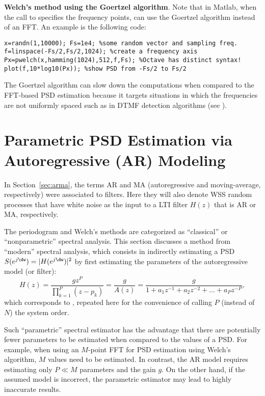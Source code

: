 \bExample \textbf{Welch's method using the Goertzel algorithm}.
Note that in Matlab, when the call to  specifies the frequency points,  can use the Goertzel algorithm instead of an FFT. An example is the following code:
\begin{lstlisting}
x=randn(1,10000); Fs=1e4; %some random vector and sampling freq.
f=linspace(-Fs/2,Fs/2,1024); %create a frequency axis
Px=pwelch(x,hamming(1024),512,f,Fs); %Octave has distinct syntax!
plot(f,10*log10(Px)); %show PSD from -Fs/2 to Fs/2
\end{lstlisting}
The Goertzel algorithm can slow down the computations when compared to the FFT-based PSD estimation because it targets situations in which the frequencies are not uniformly spaced such as in DTMF detection algorithms (see ).
\eExample 

\section{Parametric PSD Estimation via Autoregressive (AR) Modeling}
\label{sec:arModelingPSD}

In Section~\ref{sec:arma}, the terms AR and MA (autoregressive and moving-average, respectively) 
were associated to filters. Here they will also denote WSS random processes that have white noise as the
input to a LTI filter $H(z)$ that is AR or MA, respectively.

The periodogram and Welch's methods are categorized as ``classical'' or ``nonparametric'' spectral analysis.
This section discusses a method from ``modern'' spectral analysis, which consists in indirectly estimating a PSD $S(e^{j \dw})=|H(e^{j \dw})|^2$ by first estimating the parameters of the autoregressive model (or filter):
\begin{equation}
H(z) = \frac{g z^P}{\prod_{k=1}^P (z-p_k)} = \frac{g}{A(z)} = \frac{g}{1+a_1 z^{-1} +a_2 z^{-2} + \ldots  +a_P z^{-P}},
\label{eq:ar_modelP}
\end{equation}
which corresponds to , repeated here for the convenience of calling $P$ (instead of $N$) the system order.

Such ``parametric'' spectral estimator has the advantage that there are potentially fewer parameters to be estimated when compared to the values of a PSD. For example, when using an $M$-point FFT for PSD estimation using Welch's algorithm, $M$ values need to be estimated. In contrast, the AR model requires estimating only $P \ll M$ parameters and the gain $g$. On the other hand, if the assumed model is incorrect, the parametric estimator may lead to highly inaccurate results.

